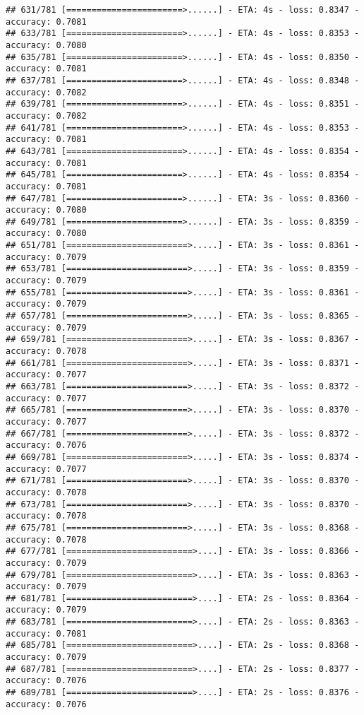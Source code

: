 \documentclass[
]{article}
\begin{document}
\begin{verbatim}
## 631/781 [=======================>......] - ETA: 4s - loss: 0.8347 - accuracy: 0.7081
## 633/781 [=======================>......] - ETA: 4s - loss: 0.8353 - accuracy: 0.7080
## 635/781 [=======================>......] - ETA: 4s - loss: 0.8350 - accuracy: 0.7081
## 637/781 [=======================>......] - ETA: 4s - loss: 0.8348 - accuracy: 0.7082
## 639/781 [=======================>......] - ETA: 4s - loss: 0.8351 - accuracy: 0.7082
## 641/781 [=======================>......] - ETA: 4s - loss: 0.8353 - accuracy: 0.7081
## 643/781 [=======================>......] - ETA: 4s - loss: 0.8354 - accuracy: 0.7081
## 645/781 [=======================>......] - ETA: 4s - loss: 0.8354 - accuracy: 0.7081
## 647/781 [=======================>......] - ETA: 3s - loss: 0.8360 - accuracy: 0.7080
## 649/781 [=======================>......] - ETA: 3s - loss: 0.8359 - accuracy: 0.7080
## 651/781 [========================>.....] - ETA: 3s - loss: 0.8361 - accuracy: 0.7079
## 653/781 [========================>.....] - ETA: 3s - loss: 0.8359 - accuracy: 0.7079
## 655/781 [========================>.....] - ETA: 3s - loss: 0.8361 - accuracy: 0.7079
## 657/781 [========================>.....] - ETA: 3s - loss: 0.8365 - accuracy: 0.7079
## 659/781 [========================>.....] - ETA: 3s - loss: 0.8367 - accuracy: 0.7078
## 661/781 [========================>.....] - ETA: 3s - loss: 0.8371 - accuracy: 0.7077
## 663/781 [========================>.....] - ETA: 3s - loss: 0.8372 - accuracy: 0.7077
## 665/781 [========================>.....] - ETA: 3s - loss: 0.8370 - accuracy: 0.7077
## 667/781 [========================>.....] - ETA: 3s - loss: 0.8372 - accuracy: 0.7076
## 669/781 [========================>.....] - ETA: 3s - loss: 0.8374 - accuracy: 0.7077
## 671/781 [========================>.....] - ETA: 3s - loss: 0.8370 - accuracy: 0.7078
## 673/781 [========================>.....] - ETA: 3s - loss: 0.8370 - accuracy: 0.7078
## 675/781 [========================>.....] - ETA: 3s - loss: 0.8368 - accuracy: 0.7078
## 677/781 [=========================>....] - ETA: 3s - loss: 0.8366 - accuracy: 0.7079
## 679/781 [=========================>....] - ETA: 3s - loss: 0.8363 - accuracy: 0.7079
## 681/781 [=========================>....] - ETA: 2s - loss: 0.8364 - accuracy: 0.7079
## 683/781 [=========================>....] - ETA: 2s - loss: 0.8363 - accuracy: 0.7081
## 685/781 [=========================>....] - ETA: 2s - loss: 0.8368 - accuracy: 0.7079
## 687/781 [=========================>....] - ETA: 2s - loss: 0.8377 - accuracy: 0.7076
## 689/781 [=========================>....] - ETA: 2s - loss: 0.8376 - accuracy: 0.7076

\end{verbatim}
\end{document}

